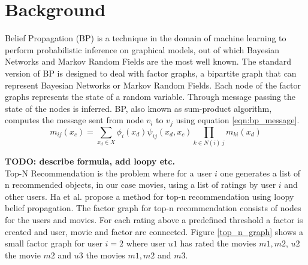 \section{Background}\label{sec:background}


Belief Propagation (BP) is a technique in the domain of machine learning to perform probabilistic inference on graphical models, out of which Bayesian Networks and Markov Random Fields are the most well known. The standard version of BP is designed to deal with factor graphs, a bipartite graph that can represent Bayesian Networks or Markov Random Fields. Each node of the factor graphs represents the state of a random variable. Through message passing the state of the nodes is inferred. BP, also known as sum-product algorithm, computes the message sent from node $v_i$ to $v_j$ using equation \ref{eqn:bp_message}.
\begin{equation}                                                            
\label{eqn:bp_message}
m_{ij}(x_c) = \sum_{x_d \in X}\phi_i(x_d)\psi_{ij}(x_d,x_c)\prod_{k \in N(i) \ j}m_{ki}(x_d)
\end{equation}

\textbf{TODO: describe formula, add loopy etc.} \\


Top-N Recommendation is the problem where for a user $i$ one generates a list of n recommended objects, in our case movies, using a list of ratings by user $i$ and other users. Ha et al. \cite{Ha:2012:TRT:2396761.2398636} propose a method for top-n recommendation using loopy belief propagation. The factor graph for top-n recommendation consists of nodes for the users and movies. For each rating above a predefined threshold a factor is created and user, movie and factor are connected. Figure \ref{top_n_graph} shows a small factor graph for user $i=2$ where user $u1$ has rated the movies $m1,m2$, $u2$ the movie $m2$ and $u3$ the movies $m1,m2$ and $m3$.  

